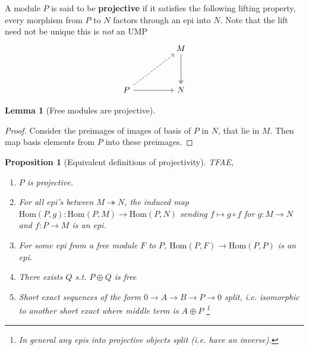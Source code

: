 \documentclass[12pt]{article}
\numberwithin{equation}{section}
\newcommand{\Hom}{{\mathrm{Hom}}}
\newtheorem{lemma}[theorem]{Lemma}
\newtheorem{proposition}{Proposition}[section]
\begin{document}
	A module $P$ is said to be \textbf{projective} if it satisfies the following lifting property, every morphism from $P$ to $N$ factors through an epi into $N$. Note that the lift need not be unique this is \textit{not} an UMP
	\[\begin{tikzcd}
		&& M \\
		\\
		P && N
		\arrow[two heads, from=1-3, to=3-3]
		\arrow[from=3-1, to=3-3]
		\arrow[dashed, from=3-1, to=1-3]
	\end{tikzcd}\]
	\begin{lemma}[Free modules are projective]
	\end{lemma}
	\begin{proof}
		Consider the preimages of images of basis of $P$ in $N$, that lie in $M$. Then map basis elements from $P$ into these preimages.
	\end{proof}
	\begin{proposition}[Equivalent definitions of projectivity]
	TFAE,
	\begin{enumerate}
		\item $P$ is projective.
		\item For all epi's between $M\twoheadrightarrow N$, the induced map $\Hom(P,g):\mathrm{Hom}(P,M) \to \mathrm{Hom}(P,N)$ sending $f \mapsto g \circ f$ for $g:M \to N$ and $f:P \to M$ is an epi.
		\item For some epi from a free module $F$ to $P$, $\mathrm{Hom}(P,F) \to \mathrm{Hom}(P,P)$ is an epi.
		\item There exists $Q$ s.t. $P \oplus Q$ is free
		\item Short exact sequences of the form $0 \to A \to B \to P \to 0$ split, i.e. isomorphic to another short exact where middle term is $A \oplus P$ \footnote{In general any epis into projective objects split (i.e. have an inverse).}
	\end{enumerate}
	\end{proposition}
\end{document}
